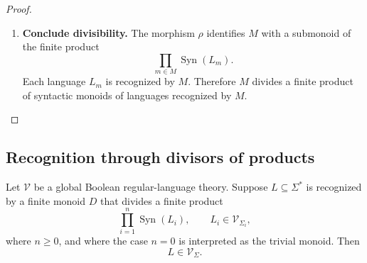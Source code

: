 \begin{proof}
\begin{enumerate}
        \item \textbf{Conclude divisibility.}
        The morphism \(\rho\) identifies \(M\) with a submonoid of the finite
        product
        \[
            \prod_{m\in M}
            \operatorname{Syn}(L_m).
        \]
        Each language \(L_m\) is recognized by \(M\). Therefore \(M\) divides
        a finite product of syntactic monoids of languages recognized by
        \(M\).
    \end{enumerate}
\end{proof}

\subsection{Recognition through divisors of products}
\label{subsec:to-recognition-divisors-products}

\begin{lemma}
\label{lem:to-recognition-products-syntactic}
    Let \(\mathcal V\) be a global Boolean regular-language theory. Suppose
    \(L\subseteq\Sigma^*\) is recognized by a finite monoid \(D\) that divides
    a finite product
    \[
        \prod_{i=1}^n\operatorname{Syn}(L_i),
        \qquad
        L_i\in\mathcal V_{\Sigma_i},
    \]
    where \(n\geq0\), and where the case \(n=0\) is interpreted as the trivial
    monoid. Then
    \[
        L\in\mathcal V_\Sigma.
    \]
\end{lemma}

